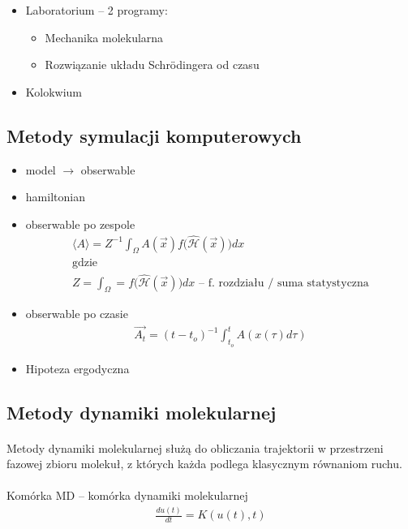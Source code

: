 \documentclass[a4paper,10pt]{article}
\newcommand*{\hham}{\hat{\mathcal{H}}}
\begin{document}
\begin{itemize}
 \item Laboratorium – 2 programy:
 \begin{itemize}
  \item Mechanika molekularna
  \item Rozwiązanie układu Schrödingera od czasu
 \end{itemize}
 \item Kolokwium
\end{itemize}

\subsection{Metody symulacji komputerowych}
\begin{itemize}
 \item model $\rightarrow$ obserwable
 \item hamiltonian
 \item obserwable po zespole 
 \begin{gather*}
  \langle A \rangle = Z^{-1} \int_\Omega A(\vec{x}) f \big( \hham(\vec{x}) \big) dx \\
  \text{gdzie} \\
  Z = \int_\Omega = f\big(\hham(\vec{x})\big)dx \text{ – f. rozdziału / suma statystyczna}
 \end{gather*}
 
 \item obserwable po czasie
 \begin{gather*}
  \vec{A_t} = (t - t_o ) ^{-1} \int_{t_o}^t A(x(\tau)d\tau)
 \end{gather*}

 \item Hipoteza ergodyczna
\end{itemize}

\subsection{Metody dynamiki molekularnej}
\paragraph{} Metody dynamiki molekularnej służą do obliczania trajektorii w przestrzeni fazowej zbioru molekuł, z których każda podlega klasycznym równaniom ruchu.
\paragraph{} Komórka MD – komórka dynamiki molekularnej
\begin{gather} \label{r_1}
 \frac{du(t)}{dt} = K(u(t),t)
\end{gather}
\end{document}
